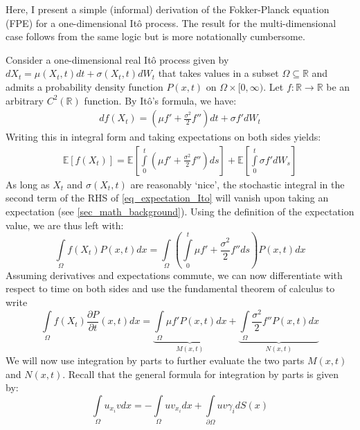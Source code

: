 Here, I present a simple (informal) derivation of the Fokker-Planck equation (FPE) for a one-dimensional It\^{o} process. The result for the multi-dimensional case follows from the same logic but is more notationally cumbersome.

Consider a one-dimensional real It\^{o} process given by $dX_t = \mu(X_t,t)dt + \sigma(X_t,t)dW_t$ that takes values in a subset $\Omega \subseteq \mathbb{R}$ and admits a probability density function $P(x,t)$ on $\Omega \times [0,\infty)$. Let $f:\mathbb{R}\to\mathbb{R}$ be an arbitrary $C^2(\mathbb{R})$ function. By It\^{o}'s formula, we have:
\begin{align*}
    df(X_t) = \left(\mu f' + \frac{\sigma^2}{2}f''\right)dt + \sigma f' dW_t
\end{align*}
Writing this in integral form and taking expectations on both sides yields:
\begin{align}
\label{eq_expectation_Ito}
    \mathbb{E}[f(X_t)] = \mathbb{E}\left[\int\limits_{0}^{t}\left(\mu f' + \frac{\sigma^2}{2}f''\right)ds\right] + \mathbb{E}\left[\int\limits_{0}^{t}\sigma f' dW_s\right]
\end{align}
As long as $X_t$ and $\sigma(X_t,t)$ are reasonably `nice', the stochastic integral in the second term of the RHS of \eqref{eq_expectation_Ito} will vanish upon taking an expectation (see \ref{sec_math_background}). Using the definition of the expectation value, we are thus left with:
\begin{equation*}
    \int\limits_{\Omega}f(X_t)P(x,t)dx = \int\limits_{\Omega}\left(\int\limits_{0}^{t}\mu f' + \frac{\sigma^2}{2}f''ds\right)P(x,t)dx
\end{equation*}
Assuming derivatives and expectations commute, we can now differentiate with respect to time on both sides and use the fundamental theorem of calculus to write
\begin{equation}
\label{eq_Ito_to_FPE_for_parts}
\int\limits_{\Omega}f(X_t)\frac{\partial P}{\partial t}(x,t)dx = \underbrace{\int\limits_{\Omega}\mu f'P(x,t)dx}_{M(x,t)} + \underbrace{\int\limits_{\Omega}\frac{\sigma^2}{2}f''P(x,t)dx}_{N(x,t)}
\end{equation}
We will now use integration by parts to further evaluate the two parts $M(x,t)$ and $N(x,t)$. Recall that the general formula for integration by parts is given by:
\begin{equation*}
    \int\limits_{\Omega}u_{x_i}vdx = -\int\limits_{\Omega}uv_{x_i}dx + \int\limits_{\partial\Omega}uv\gamma_{i}dS(x)
\end{equation*}
